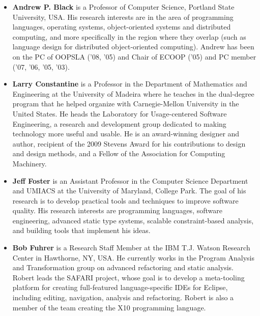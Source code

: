 \documentclass{acm_proc_article-sp}
\begin{document}
\begin{itemize}


\item \textbf{Andrew P. Black} is a Professor of Computer Science,
  Portland State University, USA. His research interests are in the
  area of programming languages, operating systems, object-oriented
  systems and distributed computing, and more specifically in the
  region where they overlap (such as language design for distributed
  object-oriented computing). Andrew has been on the PC of OOPSLA
  ('08, '05) and Chair of ECOOP ('05) and PC member ('07, '06, '05,
  '03).

\item \textbf{Larry Constantine} is a Professor in the Department of
  Mathematics and Engineering at the University of Madeira where he
  teaches in the dual-degree program that he helped organize with
  Carnegie-Mellon University in the United States. He heads the
  Laboratory for Usage-centered Software Engineering, a research and
  development group dedicated to making technology more useful and
  usable. He is an award-winning designer and author, recipient of the
  2009 Stevens Award for his contributions to design and design
  methods, and a Fellow of the Association for Computing Machinery.

\item \textbf{Jeff Foster} is an Assistant Professor in the Computer
  Science Department and UMIACS at the University of Maryland, College
  Park. The goal of his research is to develop practical tools and
  techniques to improve software quality. His research interests are
  programming languages, software engineering, advanced static type
  systems, scalable constraint-based analysis, and building tools that
  implement his ideas.

\item \textbf{Bob Fuhrer} is a Research Staff Member at the IBM
  T.J. Watson Research Center in Hawthorne, NY, USA. He currently
  works in the Program Analysis and Transformation group on advanced
  refactoring and static analysis. Robert leads the SAFARI project,
  whose goal is to develop a meta-tooling platform for creating
  full-featured language-specific IDEs for Eclipse, including editing,
  navigation, analysis and refactoring. Robert is also a member of the
  team creating the X10 programming language.


\end{itemize}
\end{document}
